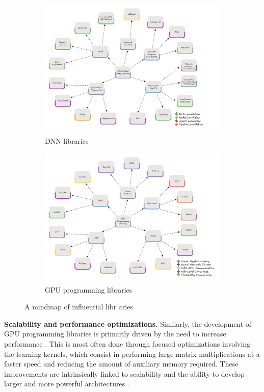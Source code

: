 \begin{figure}
	\centering
	\begin{subfigure}{0.48\linewidth}
		\includegraphics[width=\textwidth]{figures/mindmap}
		\caption{DNN libraries}
		\label{fig:mindmap-dnn}
	\end{subfigure}
	\hfill
	\begin{subfigure}{0.48\linewidth}
		\includegraphics[width=\textwidth]{figures/mindmap-cuda}
		\caption{GPU programming libraries}
		\label{fig:mindmap-cuda}
	\end{subfigure}
	\caption{A mindmap of influential libr	aries}
	\label{fig:mindmap}
\end{figure}
\textbf{Scalability and performance optimizations.}
Similarly, the development of GPU programming libraries is primarily driven by the need to increase
performance . This is most often done through focused optimizations
involving the learning kernels, which consist in performing large matrix multiplications at a
faster speed and reducing the amount of auxiliary memory required. These improvements are
intrinsically linked to scalability and the ability to develop larger and more powerful
architectures .

